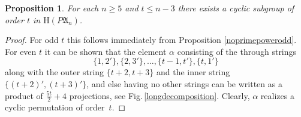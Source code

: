 \documentclass[preprint,1p,times]{elsarticle}
\numberwithin{equation}{section}
\newtheorem{Prop}[Thm]{Proposition}
\theoremstyle{remark}
\def\al{\alpha}
\def\H{\mathrm H}
\def\A{\mathfrak{A}}
\begin{document}
\begin{Prop}
\label{partialannular} For each $n\ge 5$ and $t\le n-3$ there exists a cyclic subgroup of order $t$ in $\H(P\A_n)$.
\end{Prop}

\begin{proof}
For odd $t$ this follows immediately from Proposition \ref{noprimepowerodd}. For even $t$ it can be shown that the
element $\al$ consisting of the through strings
$$\{1,2'\}, \{2,3'\},\dots,\{t-1,t'\},\{t,1'\}$$
along with the outer string $\{t{+}2,t{+}3\}$ and the inner string $\{(t{+}2)',(t{+}3)'\}$, and else having no other
strings can be written as a product of $\frac{5t}2 + 4$ projections, see Fig.\,\ref{longdecomposition}. Clearly, $\al$
realizes a cyclic permutation of order~$t$.
\end{proof}
\end{document}
